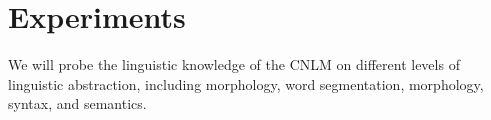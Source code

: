 \section{Experiments}
\label{sec:experiments}




We will probe the linguistic knowledge of the CNLM on different levels of linguistic abstraction, including morphology, word segmentation, morphology, syntax, and semantics.














